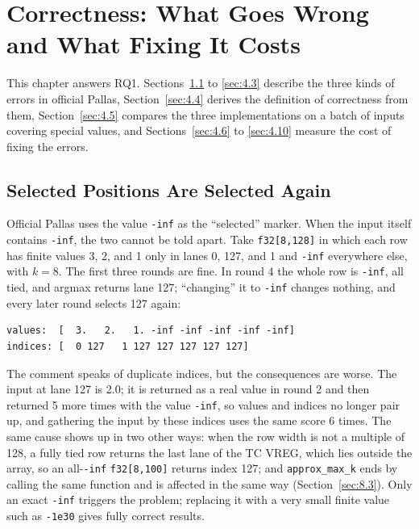 \documentclass[sigconf,nonacm,balance=false]{acmart}
\newcommand{\code}[1]{\texttt{#1}}
\begin{document}
\section{Correctness: What Goes Wrong and What Fixing It Costs}
\label{sec:4}

This chapter answers RQ1. Sections~\ref{sec:4.1} to \ref{sec:4.3} describe the three kinds of errors in official Pallas, Section~\ref{sec:4.4} derives the definition of correctness from them, Section~\ref{sec:4.5} compares the three implementations on a batch of inputs covering special values, and Sections~\ref{sec:4.6} to \ref{sec:4.10} measure the cost of fixing the errors.

\subsection{Selected Positions Are Selected Again}
\label{sec:4.1}

Official Pallas uses the value \code{-inf} as the ``selected'' marker. When the input itself contains \code{-inf}, the two cannot be told apart. Take \code{f32[8,\allowbreak{}128]} in which each row has finite values 3, 2, and 1 only in lanes 0, 127, and 1 and \code{-inf} everywhere else, with $k = 8$. The first three rounds are fine. In round 4 the whole row is \code{-inf}, all tied, and argmax returns lane 127; ``changing'' it to \code{-inf} changes nothing, and every later round selects 127 again:

\begin{lstlisting}
values:  [  3.   2.   1. -inf -inf -inf -inf -inf]
indices: [  0 127   1 127 127 127 127 127]
\end{lstlisting}
The comment speaks of duplicate indices, but the consequences are worse. The input at lane 127 is 2.0; it is returned as a real value in round 2 and then returned 5 more times with the value \code{-inf}, so values and indices no longer pair up, and gathering the input by these indices uses the same score 6 times. The same cause shows up in two other ways: when the row width is not a multiple of 128, a fully tied row returns the last lane of the TC VREG, which lies outside the array, so an all-\code{-inf} \code{f32[8,\allowbreak{}100]} returns index 127; and \code{approx\_\allowbreak{}max\_\allowbreak{}k} ends by calling the same function and is affected in the same way (Section~\ref{sec:8.3}). Only an exact \code{-inf} triggers the problem; replacing it with a very small finite value such as \code{-1e30} gives fully correct results.
\end{document}
